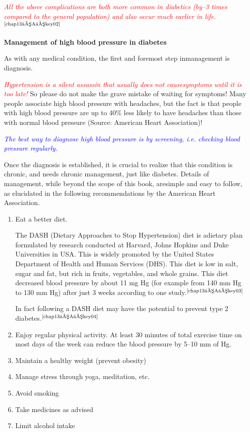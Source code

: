 \textcolor{red}{\textit{All the above complications are both more common in diabetics (by–3 times compared to the general population) and also occur much earlier in life.}}$^{\text{\cite{chap13–A–key02}}}$


\noindent\textbf{Management of high blood pressure in diabetes}

As with any medical condition, the first and foremost step in\break management is diagnosis.

\textcolor{red}{\textit{Hypertension is a silent assassin that usually does not cause\break symptoms until it is too late!}} So please do not make the grave mistake of wai\-ting for symptoms! Many people associate high blood pressure with headaches, but the fact is that people with high blood pressure are up to 40\% less likely to have headaches than those with normal blood pre\-ssure (Source: American Heart Association)!

\vskip 6pt
\textcolor{blue}{\textit{The best way to diagnose high blood pressure is by screening, i.e. checking blood pressure regularly.}}
\vskip 6pt

Once the diagnosis is established, it is crucial to realize that this condition is chronic, and needs chronic management, just like diabetes. Details of management, while beyond the scope of this book, are\break simple and easy to follow, as elucidated in the following recommenda\-tions by the American Heart Association.

\vspace{-\topsep}
\begin{enumerate}
\itemsep=0pt
\item Eat a better diet.
 
The DASH (Dietary Approaches to Stop Hypertension) diet is a\break dietary plan formulated by research conducted at Harvard, Johns Hopkins and Duke Universities in USA. This is widely promoted by the United States Department of Health and Human Services (DHS). This diet is low in salt, sugar and fat, but rich in fruits, vege\-tables, and whole grains. This diet decreased blood pressure by about 11 mg Hg (for example from 140 mm Hg to 130 mm Hg) after just 3 weeks according to one study.$^{\text{\cite{chap13–A–key03}}}$

 In fact following a DASH diet may have the potential to prevent type 2 diabetes.$^{\text{\cite{chap13–A–key04}}}$
\item Enjoy regular physical activity. At least 30 minutes of total exercise time on most days of the week can reduce the blood pressure by 5–10 mm of Hg.
\item Maintain a healthy weight (prevent obesity)
\item Manage stress through yoga, meditation, etc.
\item Avoid smoking
\item Take medicines as advised
\item Limit alcohol intake
\end{enumerate}
\vspace{-\topsep}

